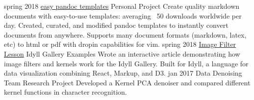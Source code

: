 \documentclass[]{friggeri-cv}
\begin{document}
\begin{entrylist}
  \entry
    {spring 2018}
    {\href{https://github.com/ryangrose/easy-pandoc-templates}{easy pandoc templates}}
    {Personal Project}
    {Create quality markdown documents with easy-to-use templates: averaging ~50 downloads worldwide per day. Created, curated, and modified pandoc templates to instantly convert documents from anywhere. Supports many document formats (markdown, latex, etc) to html or pdf with dropin capabilities for vim.}
  \entry
    {spring 2018}
    {\href{https://idyll-lang.org/gallery/stepping-into-the-filter}{Image Filter Lesson}}
    {Idyll Gallery Examples}
    {Wrote an interactive article demonstrating how image filters and kernels work for the Idyll Gallery. Built for Idyll, a language for data visualization combining React, Markup, and D3.}
   \entry
    {jan 2017}
    {Data Denoising}
    {Team Research Project}
    {Developed a Kernel PCA denoiser and compared different kernel functions in character recognition.}
\end{entrylist}





\end{document}
